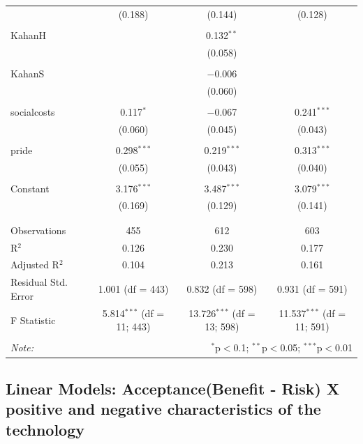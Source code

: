 \documentclass[
]{article}
\begin{document}
\begin{table}[!htbp]
\begin{tabular}{@{\extracolsep{5pt}}lccc}
  & (0.188) & (0.144) & (0.128) \\ 
  & & & \\ 
 KahanH &  & 0.132$^{**}$ &  \\ 
  &  & (0.058) &  \\ 
  & & & \\ 
 KahanS &  & $-$0.006 &  \\ 
  &  & (0.060) &  \\ 
  & & & \\ 
 socialcosts & 0.117$^{*}$ & $-$0.067 & 0.241$^{***}$ \\ 
  & (0.060) & (0.045) & (0.043) \\ 
  & & & \\ 
 pride & 0.298$^{***}$ & 0.219$^{***}$ & 0.313$^{***}$ \\ 
  & (0.055) & (0.043) & (0.040) \\ 
  & & & \\ 
 Constant & 3.176$^{***}$ & 3.487$^{***}$ & 3.079$^{***}$ \\ 
  & (0.169) & (0.129) & (0.141) \\ 
  & & & \\ 
\hline \\[-1.8ex] 
Observations & 455 & 612 & 603 \\ 
R$^{2}$ & 0.126 & 0.230 & 0.177 \\ 
Adjusted R$^{2}$ & 0.104 & 0.213 & 0.161 \\ 
Residual Std. Error & 1.001 (df = 443) & 0.832 (df = 598) & 0.931 (df = 591) \\ 
F Statistic & 5.814$^{***}$ (df = 11; 443) & 13.726$^{***}$ (df = 13; 598) & 11.537$^{***}$ (df = 11; 591) \\ 
\hline 
\hline \\[-1.8ex] 
\textit{Note:}  & \multicolumn{3}{r}{$^{*}$p$<$0.1; $^{**}$p$<$0.05; $^{***}$p$<$0.01} \\ 
\end{tabular} 
\end{table} 
\endgroup

\newpage

\hypertarget{linear-models-acceptancebenefit---risk-x-positive-and-negative-characteristics-of-the-technology}{%
\subsection{Linear Models: Acceptance(Benefit - Risk) X positive and
negative characteristics of the
technology}\label{linear-models-acceptancebenefit---risk-x-positive-and-negative-characteristics-of-the-technology}}
\end{document}

